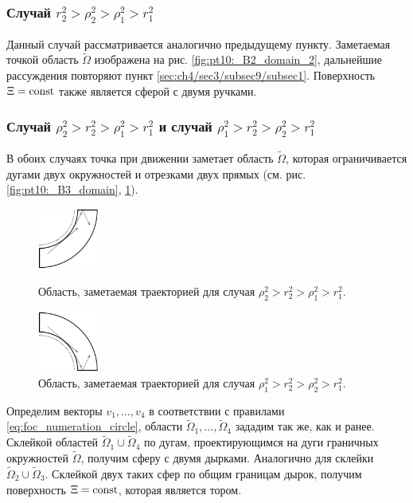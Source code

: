 \subsubsection{Случай  $r_2^2 > \rho_2^2 > \rho_1^2 > r_1^2$}\label{sec:ch4/sec3/subsec9/subsec2}
Данный случай рассматривается аналогично предыдущему пункту. Заметаемая точкой область $\widetilde{\Omega}$ изображена на рис. \ref{fig:pt10:_B2_domain_2}, дальнейшие рассуждения повторяют пункт \ref{sec:ch4/sec3/subsec9/subsec1}. Поверхность $\Xi = \mathrm{const}$ также является сферой с двумя ручками.

\subsubsection{Случай  $\rho_2^2 > r_2^2 > \rho_1^2 > r_1^2$ и случай $\rho_1^2 > r_2^2 > \rho_2^2 > r_1^2$}\label{sec:ch4/sec3/subsec9/subsec3}
В обоих случаях  точка при движении заметает область $\widetilde{\Omega}$, которая ограничивается дугами двух окружностей и отрезками двух прямых (см. рис. \ref{fig:pt10:_B3_domain}, \ref{fig:pt10:_B4_domain}).
\begin{figure}[!htb]
\centering
\includegraphics[width=2cm]{images/ch4/section3_circular/atoms/sect3_B3_domain.pdf}
    \caption{Область, заметаемая траекторией для случая $\rho_2^2 > r_2^2 > \rho_1^2 > r_1^2$.}
    \label{fig:pt10:_B3_domain}
\endminipage\hfill
{}
\centering
\includegraphics[width=2cm]{images/ch4/section3_circular/atoms/sect3_B4_domain.pdf}
    \caption{Область, заметаемая траекторией для случая $\rho_1^2 > r_2^2 > \rho_2^2 > r_1^2$.}
        \label{fig:pt10:_B4_domain}
\endminipage\hfill
\end{figure}

Определим векторы $v_1, \ldots, v_4$ в соответствии с правилами \eqref{eq:foc_numeration_circle}, области $\widetilde{\Omega}_1, \ldots, \widetilde{\Omega}_4$ зададим так же, как и ранее.
Склейкой областей $\widetilde{\Omega}_1 \cup \widetilde{\Omega}_4$ по дугам, проектирующимся на дуги граничных окружностей $\widetilde{\Omega}$, получим сферу с двумя дырками. Аналогично для склейки $\widetilde{\Omega}_2 \cup \widetilde{\Omega}_3$. Склейкой двух таких сфер по общим границам дырок, получим поверхность $\Xi = \mathrm{const}$, которая является тором.


